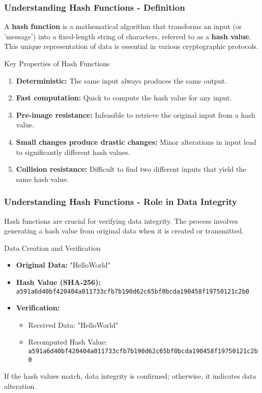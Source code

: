 \documentclass{beamer}
\begin{document}
\begin{frame}[fragile]
    \frametitle{Understanding Hash Functions - Definition}
    A \textbf{hash function} is a mathematical algorithm that transforms an input (or 'message') into a fixed-length string of characters, referred to as a \textbf{hash value}. This unique representation of data is essential in various cryptographic protocols.

    \begin{block}{Key Properties of Hash Functions}
        \begin{enumerate}
            \item \textbf{Deterministic:} The same input always produces the same output.
            \item \textbf{Fast computation:} Quick to compute the hash value for any input.
            \item \textbf{Pre-image resistance:} Infeasible to retrieve the original input from a hash value.
            \item \textbf{Small changes produce drastic changes:} Minor alterations in input lead to significantly different hash values.
            \item \textbf{Collision resistance:} Difficult to find two different inputs that yield the same hash value.
        \end{enumerate}
    \end{block}
\end{frame}

\begin{frame}[fragile]
    \frametitle{Understanding Hash Functions - Role in Data Integrity}
    Hash functions are crucial for verifying data integrity. The process involves generating a hash value from original data when it is created or transmitted.

    \begin{block}{Data Creation and Verification}
        \begin{itemize}
            \item \textbf{Original Data:} "HelloWorld"
            \item \textbf{Hash Value (SHA-256):} 
            \texttt{a591a6d40bf420404a011733cfb7b190d62c65bf0bcda190458f19750121c2b0}
            \item \textbf{Verification:}
                \begin{itemize}
                    \item Received Data: "HelloWorld"
                    \item Recomputed Hash Value: 
                    \texttt{a591a6d40bf420404a011733cfb7b190d62c65bf0bcda190458f19750121c2b0}
                \end{itemize}
        \end{itemize}
    \end{block}

    If the hash values match, data integrity is confirmed; otherwise, it indicates data alteration.
\end{frame}
\end{document}
